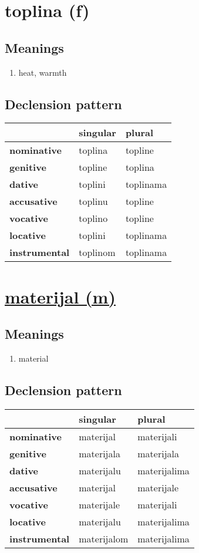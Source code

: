 \filbreak
\section{toplina (f)}
\subsection*{Meanings}
\begin{enumerate}
\item heat, warmth
\end{enumerate}
\subsection*{Declension pattern}
\begin{tabularx}{\linewidth}{Xll}
\toprule
{} &  singular &     plural \\
\midrule
\textbf{nominative  } &   toplina &    topline \\
\textbf{genitive    } &   topline &    toplina \\
\textbf{dative      } &   toplini &  toplinama \\
\textbf{accusative  } &   toplinu &    topline \\
\textbf{vocative    } &   toplino &    topline \\
\textbf{locative    } &   toplini &  toplinama \\
\textbf{instrumental} &  toplinom &  toplinama \\
\bottomrule
\end{tabularx}

\filbreak
\section{\underline{materijal (m)}}
\subsection*{Meanings}
\begin{enumerate}
\item material
\end{enumerate}
\subsection*{Declension pattern}
\begin{tabularx}{\linewidth}{Xll}
\toprule
{} &     singular &        plural \\
\midrule
\textbf{nominative  } &    materijal &    materijali \\
\textbf{genitive    } &   materijala &    materijala \\
\textbf{dative      } &   materijalu &  materijalima \\
\textbf{accusative  } &    materijal &    materijale \\
\textbf{vocative    } &   materijale &    materijali \\
\textbf{locative    } &   materijalu &  materijalima \\
\textbf{instrumental} &  materijalom &  materijalima \\
\bottomrule
\end{tabularx}

